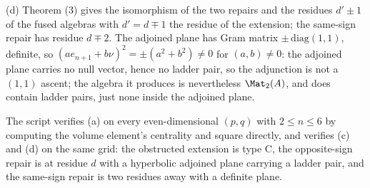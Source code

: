 (d) Theorem (3) gives the isomorphism of the two repairs and the residues $d' \pm 1$ of the fused algebras with $d' = d \mp 1$ the residue of the extension; the same-sign repair has residue $d \mp 2$. The adjoined plane has Gram matrix $\pm\,\mathrm{diag}(1,1)$, definite, so $(a e_{n+1} + b\nu)^2 = \pm(a^2 + b^2) \neq 0$ for $(a,b) \neq 0$: the adjoined plane carries no null vector, hence no ladder pair, so the adjunction is not a $(1,1)$ ascent; the algebra it produces is nevertheless $\Mat_2(A)$, and does contain ladder pairs, just none inside the adjoined plane.

The script verifies (a) on every even-dimensional $(p,q)$ with $2 \leq n \leq 6$ by computing the volume element's centrality and square directly, and verifies (c) and (d) on the same grid: the obstructed extension is type C, the opposite-sign repair is at residue $d$ with a hyperbolic adjoined plane carrying a ladder pair, and the same-sign repair is two residues away with a definite plane.
